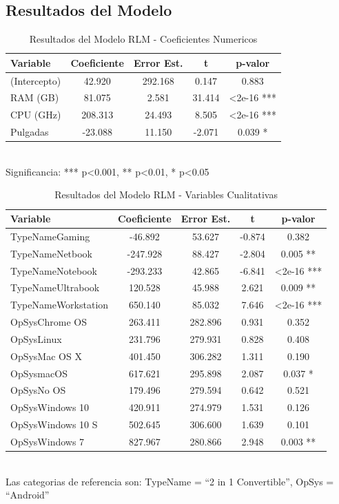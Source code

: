 \documentclass[12pt,a4paper]{article}
\begin{document}
\subsection{Resultados del Modelo}

\begin{table}[H]
\centering
\caption{Resultados del Modelo RLM - Coeficientes Numericos}
\begin{tabular}{lcccc}
\toprule
\textbf{Variable} & \textbf{Coeficiente} & \textbf{Error Est.} & \textbf{t} & \textbf{p-valor} \\
\midrule
(Intercepto) & 42.920 & 292.168 & 0.147 & 0.883 \\
RAM (GB) & 81.075 & 2.581 & 31.414 & \textless{}2e-16 *** \\
CPU (GHz) & 208.313 & 24.493 & 8.505 & \textless{}2e-16 *** \\
Pulgadas & -23.088 & 11.150 & -2.071 & 0.039 * \\
\bottomrule
\end{tabular}
\\[0.3cm]
\small Significancia: *** p\textless{}0.001, ** p\textless{}0.01, * p\textless{}0.05
\end{table}

\begin{table}[H]
\centering
\caption{Resultados del Modelo RLM - Variables Cualitativas}
\begin{tabular}{lcccc}
\toprule
\textbf{Variable} & \textbf{Coeficiente} & \textbf{Error Est.} & \textbf{t} & \textbf{p-valor} \\
\midrule
TypeNameGaming & -46.892 & 53.627 & -0.874 & 0.382 \\
TypeNameNetbook & -247.928 & 88.427 & -2.804 & 0.005 ** \\
TypeNameNotebook & -293.233 & 42.865 & -6.841 & \textless{}2e-16 *** \\
TypeNameUltrabook & 120.528 & 45.988 & 2.621 & 0.009 ** \\
TypeNameWorkstation & 650.140 & 85.032 & 7.646 & \textless{}2e-16 *** \\
\midrule
OpSysChrome OS & 263.411 & 282.896 & 0.931 & 0.352 \\
OpSysLinux & 231.796 & 279.931 & 0.828 & 0.408 \\
OpSysMac OS X & 401.450 & 306.282 & 1.311 & 0.190 \\
OpSysmacOS & 617.621 & 295.898 & 2.087 & 0.037 * \\
OpSysNo OS & 179.496 & 279.594 & 0.642 & 0.521 \\
OpSysWindows 10 & 420.911 & 274.979 & 1.531 & 0.126 \\
OpSysWindows 10 S & 502.645 & 306.600 & 1.639 & 0.101 \\
OpSysWindows 7 & 827.967 & 280.866 & 2.948 & 0.003 ** \\
\bottomrule
\end{tabular}
\\[0.3cm]
\small Las categorias de referencia son: TypeName = ``2 in 1 Convertible'', OpSys = ``Android''
\end{table}
\end{document}

